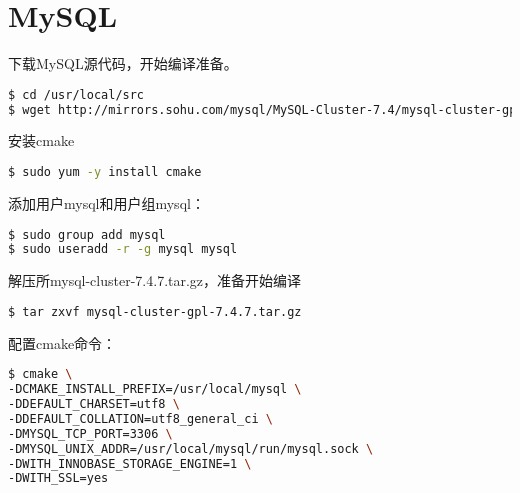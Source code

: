 \begin{lstlisting}[language=bash]

\end{lstlisting}




\begin{lstlisting}[language=bash]

\end{lstlisting}




\begin{lstlisting}[language=bash]

\end{lstlisting}




\section{MySQL}




下载MySQL源代码，开始编译准备。



\begin{lstlisting}[language=bash]
$ cd /usr/local/src
$ wget http://mirrors.sohu.com/mysql/MySQL-Cluster-7.4/mysql-cluster-gpl-7.4.7.tar.gz
\end{lstlisting}

安装cmake

\begin{lstlisting}[language=bash]
$ sudo yum -y install cmake
\end{lstlisting}

添加用户mysql和用户组mysql：


\begin{lstlisting}[language=bash]
$ sudo group add mysql
$ sudo useradd -r -g mysql mysql
\end{lstlisting}

解压所mysql-cluster-7.4.7.tar.gz，准备开始编译


\begin{lstlisting}[language=bash]
$ tar zxvf mysql-cluster-gpl-7.4.7.tar.gz
\end{lstlisting}

配置cmake命令：


\begin{lstlisting}[language=bash]
$ cmake \
-DCMAKE_INSTALL_PREFIX=/usr/local/mysql \
-DDEFAULT_CHARSET=utf8 \
-DDEFAULT_COLLATION=utf8_general_ci \
-DMYSQL_TCP_PORT=3306 \
-DMYSQL_UNIX_ADDR=/usr/local/mysql/run/mysql.sock \
-DWITH_INNOBASE_STORAGE_ENGINE=1 \
-DWITH_SSL=yes
\end{lstlisting}

